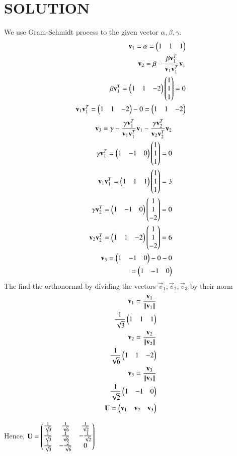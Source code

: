 \documentclass[journal,12pt,twocolumn]{IEEEtran}
\begin{document}
\section{SOLUTION}
 We use Gram-Schmidt process to the given vector $\alpha,\beta,\gamma$.
 \begin{align}
 \mathbf{v}_1=\mathbf{\alpha}=\begin{pmatrix}1&1&1\end{pmatrix}\\
 \mathbf{v}_2=\mathbf{\beta}-\frac{\mathbf{\beta}\mathbf{v}_{1}^{T}}{\mathbf{v}_1\mathbf{v}_{1}^{T}}\mathbf{v}_1\\
 \mathbf{\beta}\mathbf{v}_{1}^{T}=\begin{pmatrix}1&1&-2\end{pmatrix}\begin{pmatrix}1\\1\\1\end{pmatrix}=0\\
 \mathbf{v}_1\mathbf{v}_{1}^{T}=\begin{pmatrix}1&1&-2\end{pmatrix}-0=\begin{pmatrix}1&1&-2\end{pmatrix}
\end{align}
\begin{align}
 \mathbf{v}_3=\mathbf{\gamma}-\frac{\gamma\mathbf{v}_{1}^{T}}{\mathbf{v}_1\mathbf{v}_{1}^{T}}\mathbf{v}_1-\frac{\gamma\mathbf{v}_{2}^{T}}{\mathbf{v}_2\mathbf{v}_{2}^{T}}\mathbf{v}_2\\
 \mathbf{\gamma}\mathbf{v}_{1}^{T}=\begin{pmatrix}1&-1&0\end{pmatrix}\begin{pmatrix}1\\1\\1\end{pmatrix}=0\\
\mathbf{v}_1\mathbf{v}_{1}^{T}=\begin{pmatrix}1&1&1\end{pmatrix}\begin{pmatrix}1\\1\\1\end{pmatrix}=3\\
\gamma\mathbf{v}_{2}^{T}=\begin{pmatrix}1&-1&0\end{pmatrix}\begin{pmatrix}1\\1\\-2\end{pmatrix}=0\\
\mathbf{v}_2\mathbf{v}_{2}^{T}=\begin{pmatrix}1&1&-2\end{pmatrix}\begin{pmatrix}1\\1\\-2\end{pmatrix}=6\\
\mathbf{v}_3=\begin{pmatrix}1&-1&0\end{pmatrix}-0-0\\
=\begin{pmatrix}1&-1&0\end{pmatrix}
 \end{align}
 The find the orthonormal by dividing the vectors $\vec{v}_1,\vec{v}_2,\vec{v}_3$ by their norm
 \begin{align}
 \mathbf{v}_1=\frac{\mathbf{v}_1}{\left\lVert\mathbf{v}_1\right\rVert}\\
 \frac{1}{\sqrt{3}}\begin{pmatrix}1&1&1\end{pmatrix}\\
 \mathbf{v}_2=\frac{\mathbf{v}_2}{\left\lVert\mathbf{v}_2\right\rVert}\\
  \frac{1}{\sqrt{6}}\begin{pmatrix}1&1&-2\end{pmatrix}\\
   \mathbf{v}_3=\frac{\mathbf{v}_3}{\left\lVert\mathbf{v}_3\right\rVert}\\
   \frac{1}{\sqrt{2}}\begin{pmatrix}1&-1&0\end{pmatrix}\\
   \mathbf{U}=\begin{pmatrix}\mathbf{v}_1&\mathbf{v}_2&\mathbf{v}_3\end{pmatrix}
 \end{align}

Hence,
$\mathbf{U}=\begin{pmatrix}\frac{1}{\sqrt{3}}&\frac{1}{\sqrt{6}}&\frac{1}{\sqrt{2}}\\\frac{1}{\sqrt{3}}&\frac{1}{\sqrt{6}}&-\frac{1}{\sqrt{2}}\\\frac{1}{\sqrt{3}}&-\frac{2}{\sqrt{6}}&0\end{pmatrix}$
\end{document}
